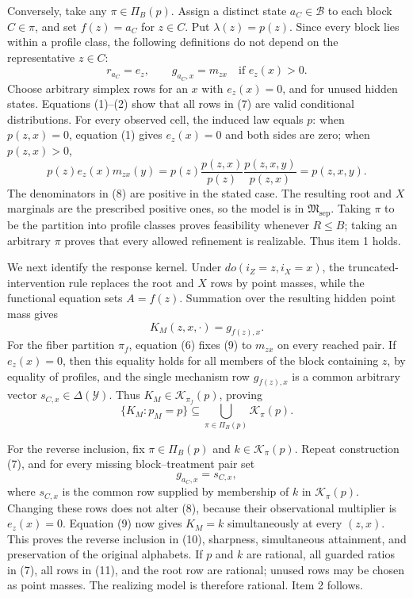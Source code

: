 Conversely, take any \(\pi\in\Pi_B(p)\).  Assign a distinct state
\(a_C\in\mathcal B\) to each block \(C\in\pi\), and set
\(f(z)=a_C\) for \(z\in C\).  Put \(\lambda(z)=p(z)\).  Since every block
lies within a profile class, the following definitions do not depend on
the representative \(z\in C\):
\[
 r_{a_C}=e_z,
 \qquad
 g_{a_C,x}=m_{zx}\quad\text{if }e_z(x)>0.
\tag{7}
\]
Choose arbitrary simplex rows for an \(x\) with \(e_z(x)=0\), and for
unused hidden states.  Equations (1)--(2) show that all rows in (7) are
valid conditional distributions.  For every observed cell, the induced
law equals \(p\): when \(p(z,x)=0\), equation (1) gives \(e_z(x)=0\) and
both sides are zero; when \(p(z,x)>0\),
\[
 p(z)e_z(x)m_{zx}(y)
 =p(z)\frac{p(z,x)}{p(z)}
       \frac{p(z,x,y)}{p(z,x)}
 =p(z,x,y).
\tag{8}
\]
The denominators in (8) are positive in the stated case.  The resulting
root and \(X\) marginals are the prescribed positive ones, so the model is
in \(\mathfrak M_{\mathrm{sep}}\).  Taking \(\pi\) to be the partition
into profile classes proves feasibility whenever \(R\leq B\); taking an
arbitrary \(\pi\) proves that every allowed refinement is realizable.
Thus item 1 holds.

We next identify the response kernel.  Under \(do(i_Z=z,i_X=x)\), the
truncated-intervention rule replaces the root and \(X\) rows by point
masses, while the functional equation sets \(A=f(z)\).  Summation over
the resulting hidden point mass gives
\[
 K_M(z,x,\cdot)=g_{f(z),x}.
\tag{9}
\]
For the fiber partition \(\pi_f\), equation (6) fixes (9) to \(m_{zx}\)
on every reached pair.  If \(e_z(x)=0\), then this equality holds for all
members of the block containing \(z\), by equality of profiles, and the
single mechanism row \(g_{f(z),x}\) is a common arbitrary vector
\(s_{C,x}\in\Delta(\mathcal Y)\).  Thus
\(K_M\in\mathcal K_{\pi_f}(p)\), proving
\[
 \{K_M:p_M=p\}\subseteq
 \bigcup_{\pi\in\Pi_B(p)}\mathcal K_\pi(p).
\tag{10}
\]

For the reverse inclusion, fix \(\pi\in\Pi_B(p)\) and
\(k\in\mathcal K_\pi(p)\).  Repeat construction (7), and for every
missing block--treatment pair set
\[
 g_{a_C,x}=s_{C,x},
\tag{11}
\]
where \(s_{C,x}\) is the common row supplied by membership of \(k\) in
\(\mathcal K_\pi(p)\).  Changing these rows does not alter (8), because
their observational multiplier is \(e_z(x)=0\).  Equation (9) now gives
\(K_M=k\) simultaneously at every \((z,x)\).  This proves the reverse
inclusion in (10), sharpness, simultaneous attainment, and preservation of
the original alphabets.  If \(p\) and \(k\) are rational, all guarded
ratios in (7), all rows in (11), and the root row are rational; unused
rows may be chosen as point masses.  The realizing model is therefore
rational.  Item 2 follows.

